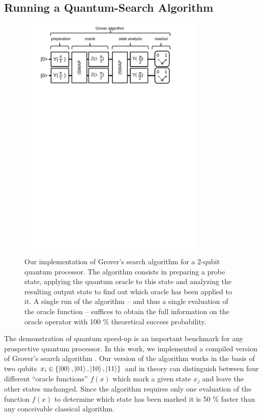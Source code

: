 \subsection{Running a Quantum-Search Algorithm}

\begin{figure}[ht!]
	\centering
		\includegraphics[width=0.8\textwidth]{./material/papers/grover/figures/grover_algorithm_schematic}
	\caption[Schematic of our implementation of Grover's search algorithm]{Our implementation of Grover's search algorithm for a 2-qubit quantum processor. The algorithm consists in preparing a probe state, applying the quantum oracle to this state and analyzing the resulting output state to find out which oracle has been applied to it. A single run of the algorithm -- and thus a single evaluation of the oracle function -- suffices to obtain the full information on the oracle operator with 100 \% theoretical success probability.}
	\label{fig:GroverAlgorithmSchematic}
\end{figure}

The demonstration of quantum speed-up is an important benchmark for any prospective quantum processor. In this work, we implemented a compiled version of Grover's search algorithm \citep{Grover_Quantum_1997}. Our version of the algorithm works in the basis of two qubits $x_i \in \{\left| 00 \right>,\left| 01 \right>,\left| 10 \right>,\left| 11 \right>\}$ and in theory can distinguish between four different ``oracle functions'' $f(x)$ which mark a given state $x_j$ and leave the other states unchanged. Since the algorithm requires only one evaluation of the function $f(x)$ to determine which state has been marked it is 50 \% faster than any conceivable classical algorithm. 

